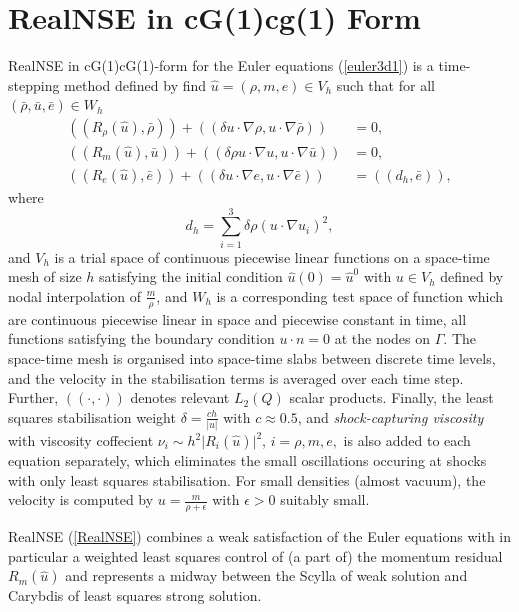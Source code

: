 \section{RealNSE in cG(1)cg(1) Form}



RealNSE in cG(1)cG(1)-form for the Euler equations (\ref{euler3d1}) 
is a time-stepping method defined by 
find $\hat u =(\rho ,m,e )\in V_h$ such that for all 
$(\bar\rho ,\bar u,\bar e )\in W_h$
\begin{equation}\label{RealNSE}
\begin{split}
((R_\rho (\hat u),\bar\rho ))+((\delta u\cdot\nabla\rho , 
u\cdot\nabla\bar\rho ))&=0,\\
((R_m(\hat u),\bar u))+
((\delta \rho u\cdot\nabla u, u\cdot\nabla\bar u))&=0,\\
((R_e (\hat u),\bar e ))+
((\delta u\cdot\nabla e ,u\cdot\nabla\bar e ))&=
((d_h,\bar e)),
\end{split}
\end{equation}
where
\begin{equation}\label{dh}
d_h=\sum_{i=1}^3\delta \rho(u\cdot\nabla u_i)^2,
\end{equation}
and $V_h$ is a trial space of continuous piecewise linear 
functions on a space-time mesh of size $h$ satisfying the initial
condition $\hat u(0)=\hat u^0$ with $u\in V_h$ defined by
nodal interpolation of $\frac{m}{\rho}$, and $W_h$ 
is a corresponding test space of function which are
continuous piecewise linear in space and piecewise constant in time,
all functions satisfying the boundary condition $u\cdot n=0$ at the 
nodes on $\Gamma$. The space-time mesh is organised 
into space-time slabs between discrete time levels, and  
the velocity in the stabilisation terms is averaged over each time step.
Further, $((\cdot ,\cdot ))$  denotes relevant  
$L_2(Q)$ scalar products. Finally, the least squares
stabilisation weight 
$\delta=\frac{ch}{\vert u\vert}$ with $c\approx 0.5$,
and \emph{shock-capturing viscosity}
with viscosity coffecient 
$\nu_i\sim h^2\vert R_i(\hat u)\vert^2$, $i=\rho ,m,e,$ is also added
to each equation separately, which eliminates 
the small oscillations occuring at shocks with only
least squares stabilisation. For small densities (almost vacuum), the
velocity is computed by $u=\frac{m}{\rho +\epsilon}$ with
$\epsilon >0$ suitably small.
 
RealNSE (\ref{RealNSE}) combines a weak satisfaction of the Euler equations
with in particular a weighted least squares control of (a part of) the 
momentum residual $R_m(\hat u)$ and
represents a midway between the Scylla of weak solution and
Carybdis of least squares strong solution. 

